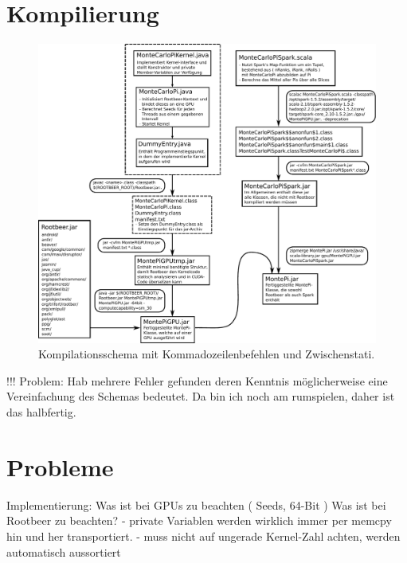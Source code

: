 \section{Kompilierung}


\begin{figure}[H]
    \centering
    \begin{minipage}{\linewidth}
        \includegraphics[width=\linewidth]{compile-structure-deu.pdf}
    \end{minipage}
    \caption{Kompilationsschema mit Kommadozeilenbefehlen und Zwischenstati.}
    \label{fig:compilation}
\end{figure}

!!! Problem: Hab mehrere Fehler gefunden deren Kenntnis möglicherweise eine Vereinfachung des Schemas bedeutet. Da bin ich noch am rumspielen, daher ist das halbfertig.

\section{Probleme}
Implementierung:
    Was ist bei GPUs zu beachten ( Seeds, 64-Bit )
    Was ist bei Rootbeer zu beachten?
      - private Variablen werden wirklich immer per memcpy hin und her transportiert.
      - muss nicht auf ungerade Kernel-Zahl achten, werden automatisch aussortiert
